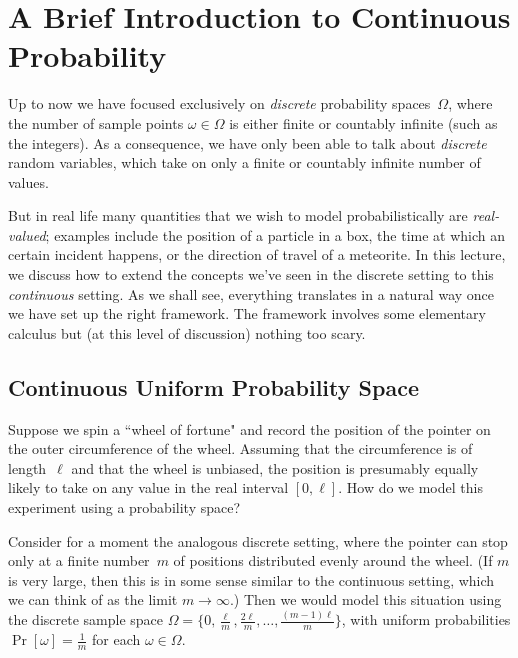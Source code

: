 \documentclass[11pt]{article}
\begin{document}
\maketitle

\section*{A Brief Introduction to Continuous Probability}
Up to now we have focused exclusively on {\it discrete\/} probability spaces~$\Omega$,
where the number of sample points $\omega\in\Omega$ is either finite or countably
infinite (such as the integers).  As a consequence, we have only been able to talk about
{\it discrete\/} random variables, which take on only a finite or countably infinite number
of values.

But in real life many quantities that we wish to model probabilistically are {\it real-valued\/};
examples include the position of a particle in a box, the time at which an certain incident happens,
or the direction of travel of a meteorite.  In this lecture, we discuss how to extend the concepts
we've seen in the discrete setting to this {\em continuous} setting.  As we shall see, everything
translates in a natural way once we have set up the right framework.  The framework involves
some elementary calculus but (at this level of discussion) nothing too scary.


\subsection*{Continuous Uniform Probability Space}

Suppose we spin a ``wheel of fortune" and record the position of the pointer on
the outer circumference of the wheel.  Assuming that the circumference is of length~$\ell$
and that the wheel is unbiased, the position is presumably equally likely to take on
any value in the real interval $[0,\ell]$.  How do we model this experiment using a
probability space?

Consider for a moment the analogous discrete setting, where the pointer
can stop only at a finite number~$m$ of positions distributed evenly around the
wheel. (If $m$ is very large, then this is in some sense similar to the
continuous setting, which we can think of as the limit $m \to \infty$.)
Then we would model this situation using the discrete sample space
$\Omega = \{0,\frac{\ell}{m},\frac{2\ell}{m},\ldots,\frac{(m-1)\ell}{m}\}$, with
uniform probabilities $\Pr[\omega] = \frac{1}{m}$ for each $\omega\in\Omega$.
\end{document}
